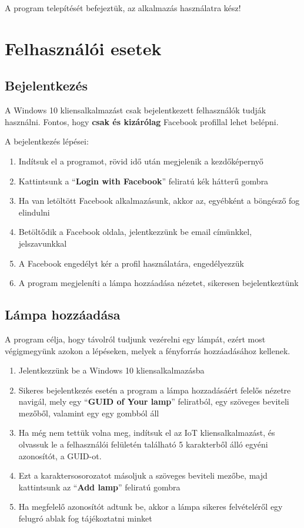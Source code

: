 \documentclass[a4paper,12pt]{report}
\begin{document}
    A program telepítését befejeztük, az alkalmazás használatra kész!

\section{Felhasználói esetek}

\subsection{Bejelentkezés}
    A Windows 10 kliensalkalmazást csak bejelentkezett felhasználók tudják használni. Fontos, hogy \textbf{csak és kizárólag}
    Facebook profillal lehet belépni.

    A bejelentkezés lépései:

\begin{enumerate}
    \item Indítsuk el a programot, rövid idő után megjelenik a kezdőképernyő
    \item Kattintsunk a ``\textbf{Login with Facebook}'' feliratú kék hátterű gombra
    \item Ha van letöltött Facebook alkalmazásunk, akkor az, egyébként a böngésző fog elindulni
    \item Betöltődik a Facebook oldala, jelentkezzünk be email címünkkel, jelszavunkkal
    \item A Facebook engedélyt kér a profil használatára, engedélyezzük
    \item A program megjeleníti a lámpa hozzáadása nézetet, sikeresen bejelentkeztünk
\end{enumerate}

\subsection{Lámpa hozzáadása}
    A program célja, hogy távolról tudjunk vezérelni egy lámpát, ezért most végigmegyünk azokon a lépéseken, melyek a fényforrás
    hozzáadásához kellenek.

\begin{enumerate}
    \item Jelentkezzünk be a Windows 10 kliensalkalmazásba
    \item Sikeres bejelentkezés esetén a program a lámpa hozzadásáért felelős nézetre navigál, mely egy ``\textbf{GUID of Your lamp}''
    feliratból, egy szöveges beviteli mezőből, valamint egy egy gombból áll
    \item Ha még nem tettük volna meg, indítsuk el az IoT kliensalkalmazást, és olvassuk le a felhasználói felületén található
    5 karakterből álló egyéni azonosítót, a GUID-ot.
    \item Ezt a karaktersosorozatot másoljuk a szöveges beviteli mezőbe, majd kattintsunk az ``\textbf{Add lamp}'' feliratú gombra
    \item Ha megfelelő azonosítót adtunk be, akkor a lámpa sikeres felvételéről egy felugró ablak fog tájékoztatni minket
\end{enumerate}
\end{document}

